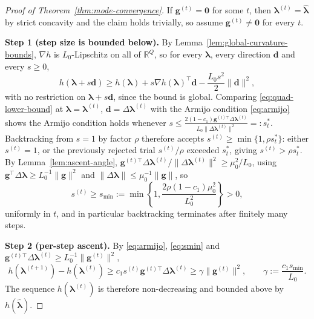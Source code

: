 \begin{proof}[Proof of Theorem~\ref{thm:mode-convergence}]
If $\mathbf{g}^{(t)}=\bm{0}$ for some $t$, then $\bm{\lambda}^{(t)}=\hat{\bm{\lambda}}$ by strict concavity and the claim holds trivially, so assume $\mathbf{g}^{(t)}\neq\bm{0}$ for every $t$.

\noindent\textbf{Step 1 (step size is bounded below).} By Lemma~\ref{lem:global-curvature-bounds}, $\nabla h$ is $L_{0}$-Lipschitz on all of $\mathbb{R}^{Q}$, so for every $\bm{\lambda}$, every direction $\mathbf{d}$ and every $s\geq0$,
\begin{equation}
    h(\bm{\lambda}+s\mathbf{d})\geq h(\bm{\lambda})+s\nabla h(\bm{\lambda})^{\top}\mathbf{d}-\frac{L_{0}s^{2}}{2}\|\mathbf{d}\|^{2},
    \label{eq:quad-lower-bound}
\end{equation}
with no restriction on $\bm{\lambda}+s\mathbf{d}$, since the bound is global. Comparing \eqref{eq:quad-lower-bound} at $\bm{\lambda}=\bm{\lambda}^{(t)}$, $\mathbf{d}=\Delta\bm{\lambda}^{(t)}$ with the Armijo condition \eqref{eq:armijo} shows the Armijo condition holds whenever $s\leq\frac{2(1-c_{1})\mathbf{g}^{(t)\top}\Delta\bm{\lambda}^{(t)}}{L_{0}\|\Delta\bm{\lambda}^{(t)}\|^{2}}=:s^{*}_{t}$. Backtracking from $s=1$ by factor $\rho$ therefore accepts $s^{(t)}\geq\min\{1,\rho s^{*}_{t}\}$: either $s^{(t)}=1$, or the previously rejected trial $s^{(t)}/\rho$ exceeded $s^{*}_{t}$, giving $s^{(t)}>\rho s^{*}_{t}$. By Lemma~\ref{lem:ascent-angle}, $\mathbf{g}^{(t)\top}\Delta\bm{\lambda}^{(t)}/\|\Delta\bm{\lambda}^{(t)}\|^{2}\geq\mu_{0}^{2}/L_{0}$, using $\mathbf{g}^{\top}\Delta\bm{\lambda}\geq L_{0}^{-1}\|\mathbf{g}\|^{2}$ and $\|\Delta\bm{\lambda}\|\leq\mu_{0}^{-1}\|\mathbf{g}\|$, so
\begin{equation}
    s^{(t)}\geq s_{\min}:=\min\left\{1,\frac{2\rho(1-c_{1})\mu_{0}^{2}}{L_{0}^{2}}\right\}>0,
    \label{eq:smin}
\end{equation}
uniformly in $t$, and in particular backtracking terminates after finitely many steps.

\noindent\textbf{Step 2 (per-step ascent).} By \eqref{eq:armijo}, \eqref{eq:smin} and $\mathbf{g}^{(t)\top}\Delta\bm{\lambda}^{(t)}\geq L_{0}^{-1}\|\mathbf{g}^{(t)}\|^{2}$,
\begin{equation}
    h(\bm{\lambda}^{(t+1)})-h(\bm{\lambda}^{(t)})\geq c_{1}s^{(t)}\mathbf{g}^{(t)\top}\Delta\bm{\lambda}^{(t)}\geq\gamma\|\mathbf{g}^{(t)}\|^{2},\qquad\gamma:=\frac{c_{1}s_{\min}}{L_{0}}.
    \label{eq:per-step-ascent}
\end{equation}
The sequence $h(\bm{\lambda}^{(t)})$ is therefore non-decreasing and bounded above by $h(\hat{\bm{\lambda}})$.


\end{proof}

